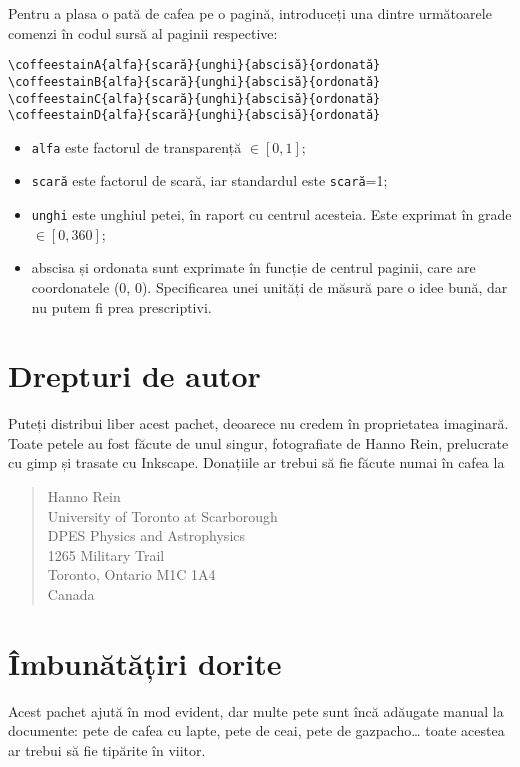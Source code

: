\documentclass[a4paper, 11pt, BCOR = 0 pt, oneside]{scrartcl}
\begin{document}
Pentru a plasa o pată de cafea pe o pagină, introduceți una dintre următoarele comenzi în codul sursă al paginii respective: 
\begin{verbatim}
\coffeestainA{alfa}{scară}{unghi}{abscisă}{ordonată}
\coffeestainB{alfa}{scară}{unghi}{abscisă}{ordonată}
\coffeestainC{alfa}{scară}{unghi}{abscisă}{ordonată}
\coffeestainD{alfa}{scară}{unghi}{abscisă}{ordonată}
\end{verbatim}

\begin{itemize}
\item \texttt{alfa} este factorul de transparență $\in [0,1]$;
\item \texttt{scară} este factorul de scară, iar standardul este \texttt{scară}=1;
\item \texttt{unghi} este unghiul petei, în raport cu centrul acesteia. Este exprimat în grade $\in [0,360]$;
\item abscisa și ordonata sunt exprimate în funcție de centrul paginii, care are coordonatele (0, 0). Specificarea unei unități de măsură pare o idee bună, dar nu putem fi prea prescriptivi.
\end{itemize}


\section{Drepturi de autor}
Puteți distribui liber acest pachet, deoarece nu credem în proprietatea
imaginară. Toate petele au fost făcute de unul singur, fotografiate de Hanno
Rein, prelucrate cu gimp și trasate cu Inkscape. Donațiile ar trebui să fie
făcute numai în cafea la
\begin{quote}
Hanno Rein\\
University of Toronto at Scarborough\\
DPES Physics and Astrophysics\\
1265 Military Trail\\
Toronto, Ontario M1C 1A4\\
Canada
\end{quote}

\section{Îmbunătățiri dorite}
Acest pachet ajută în mod evident, dar multe pete sunt încă adăugate manual la
documente: pete de cafea cu lapte, pete de ceai, pete de gazpacho\dots{} toate
acestea ar trebui să fie tipărite în viitor.
\end{document}
